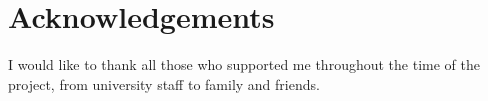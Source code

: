 \section*{Acknowledgements}
I would like to thank all those who supported me throughout the time of the project, from university staff to family and friends.